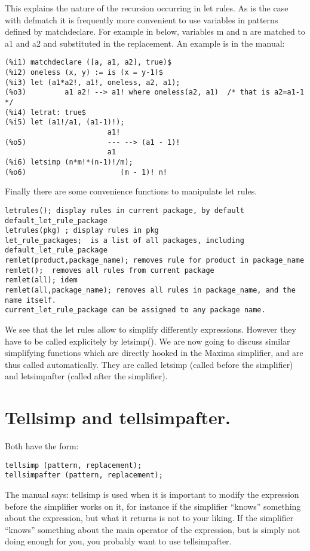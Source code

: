 \documentclass[a4paper,11pt]{article}
\begin{document}
This explains the nature of the recursion occurring in let rules. As
is the case with defmatch it is frequently more convenient to use
variables in patterns defined by matchdeclare.  For example in %
below, variables m and n are matched to a1 and a2 and substituted in
the replacement. An example is in the manual:
\begin{verbatim}
(%i1) matchdeclare ([a, a1, a2], true)$
(%i2) oneless (x, y) := is (x = y-1)$
(%i3) let (a1*a2!, a1!, oneless, a2, a1);
(%o3)         a1 a2! --> a1! where oneless(a2, a1)  /* that is a2=a1-1 */
(%i4) letrat: true$
(%i5) let (a1!/a1, (a1-1)!);
                        a1!
(%o5)                   --- --> (a1 - 1)!
                        a1
(%i6) letsimp (n*m!*(n-1)!/m);
(%o6)                      (m - 1)! n!
\end{verbatim}

Finally there are some convenience functions to manipulate let rules.
\begin{verbatim}
letrules(); display rules in current package, by default default_let_rule_package
letrules(pkg) ; display rules in pkg
let_rule_packages;  is a list of all packages, including default_let_rule_package
remlet(product,package_name); removes rule for product in package_name
remlet();  removes all rules from current package
remlet(all); idem
remlet(all,package_name); removes all rules in package_name, and the name itself.
current_let_rule_package can be assigned to any package name.
\end{verbatim}
We see that the let rules allow to simplify differently expressions. However they
have to be called explicitely by letsimp(). We are now going to discuss similar
simplifying functions which are directly hooked in the Maxima simplifier, and are
thus called automatically. They are called letsimp (called before the simplifier)
and letsimpafter (called after the simplifier).


\section{Tellsimp and tellsimpafter.}


Both have the form:

\begin{verbatim}
tellsimp (pattern, replacement);
tellsimpafter (pattern, replacement);
\end{verbatim}

The manual says: tellsimp is used when it is important to modify the
expression before the simplifier works on it, for instance if the
simplifier ``knows'' something about the expression, but what it returns
is not to your liking. If the simplifier ``knows'' something about the
main operator of the expression, but is simply not doing enough for
you, you probably want to use tellsimpafter.  
\end{document}
